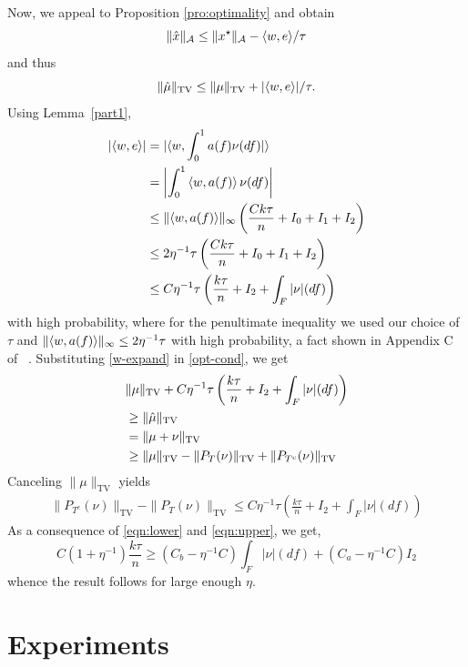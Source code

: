 Now, we appeal to Proposition \ref{pro:optimality} and obtain
\[
\lVert\hat{x}\rVert_{\mathcal{A}} \leq \lVert x^\star\rVert_{\mathcal{A}} - \langle w, e \rangle/\tau
\]
and thus
\begin{equation}
\label{opt-cond}
\lVert\hat{\mu}\rVert_{\mathrm{TV}} \leq \lVert\mu\rVert_{\mathrm{TV}} + |\langle w, e \rangle|/\tau.
\end{equation}
Using Lemma~\ref{part1},
\begin{align}
\nonumber |\langle w, e \rangle| & = |\langle w, \int_0^1 a(f) \nu(df)  |\rangle\\
& = \left|\int_0^1  \left\langle w,  a(f)  \right\rangle \nu(df)\right|\\
\nonumber & \leq \lVert\left\langle w,  a(f)  \right\rangle\rVert_\infty\left(\frac{C k \tau}{n} + I_0 + I_1 + I_2\right)\\
\label{w-expand}& \leq 2\eta^{-1} \tau \left(\frac{C k \tau}{n} + I_0 + I_1 + I_2\right)\nonumber \\
 & \leq C \eta^{-1} \tau \left(\frac{k\tau}{n} + I_2 + \int_F |\nu|(df) \right)
\end{align}
with high probability, where for the penultimate inequality we used our choice of $\tau$ and $\lVert\left\langle w,  a(f)  \right\rangle\rVert_\infty \leq 2\eta^{-1} \tau$ with high probability, a fact shown in Appendix C of ~\cite{btr12}. 
Substituting \eqref{w-expand} in \eqref{opt-cond}, we get
\begin{align*}
& \lVert\mu\rVert_{\mathrm{TV}} + C \eta^{-1} \tau \left(\frac{k\tau}{n} + I_2 + \int_F |\nu|(df) \right)\\
& \geq \lVert\hat{\mu}\rVert_{\mathrm{TV}}\\
& = \lVert\mu + \nu\rVert_{\mathrm{TV}}\\
& \geq \lVert\mu\rVert_{\mathrm{TV}} - \lVert{P_T(\nu)}\rVert_{\mathrm{TV}} + \lVert{P_{T^c}(\nu)}\rVert_{\mathrm{TV}}\end{align*}
Canceling $\|\mu\|_{\mathrm{TV}}$ yields 
\begin{align}\label{eqn:upper}
\|P_{T^c}(\nu)\|_{\mathrm{TV}} - \|P_T(\nu)\|_{\mathrm{TV}} \leq C\eta^{-1}\tau \left(\frac{k \tau}{n} + I_2 + \int_F |\nu|(df)\right)
\end{align}
As a consequence of \eqref{eqn:lower} and \eqref{eqn:upper}, we get,
\[
  C(1+\eta^{-1}) \frac{k \tau}{n} \geq  ( C_b - \eta^{-1} C)  \int_F{|\nu|(df)} + ( C_a - \eta^{-1} C)I_2
\]
whence the result follows for large enough $\eta.$

\section{Experiments}
\label{sec:experiments}

